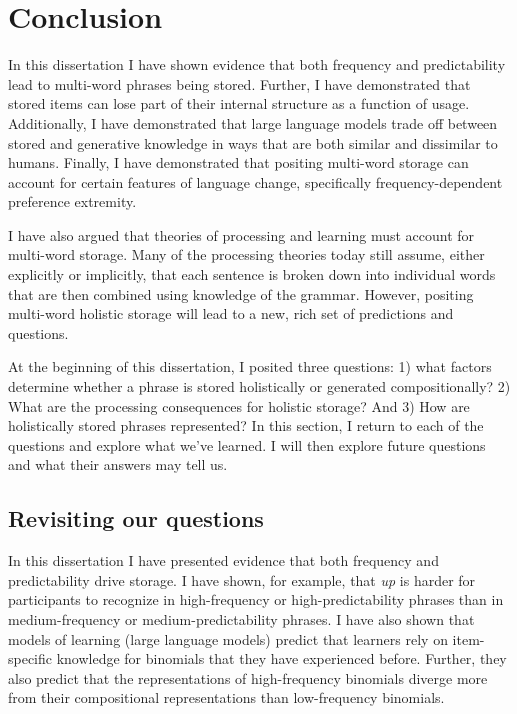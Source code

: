 \documentclass[
  12pt,
  letterpaper,
]{scrreport}
\begin{document}

\chapter{Conclusion}\label{conclusion-4}

In this dissertation I have shown evidence that both frequency and
predictability lead to multi-word phrases being stored. Further, I have
demonstrated that stored items can lose part of their internal structure
as a function of usage. Additionally, I have demonstrated that large
language models trade off between stored and generative knowledge in
ways that are both similar and dissimilar to humans. Finally, I have
demonstrated that positing multi-word storage can account for certain
features of language change, specifically frequency-dependent preference
extremity.

I have also argued that theories of processing and learning must account
for multi-word storage. Many of the processing theories today still
assume, either explicitly or implicitly, that each sentence is broken
down into individual words that are then combined using knowledge of the
grammar. However, positing multi-word holistic storage will lead to a
new, rich set of predictions and questions.

At the beginning of this dissertation, I posited three questions: 1)
what factors determine whether a phrase is stored holistically or
generated compositionally? 2) What are the processing consequences for
holistic storage? And 3) How are holistically stored phrases
represented? In this section, I return to each of the questions and
explore what we've learned. I will then explore future questions and
what their answers may tell us.

\section{Revisiting our questions}\label{revisiting-our-questions}

In this dissertation I have presented evidence that both frequency and
predictability drive storage. I have shown, for example, that \emph{up}
is harder for participants to recognize in high-frequency or
high-predictability phrases than in medium-frequency or
medium-predictability phrases. I have also shown that models of learning
(large language models) predict that learners rely on item-specific
knowledge for binomials that they have experienced before. Further, they
also predict that the representations of high-frequency binomials
diverge more from their compositional representations than low-frequency
binomials.
\end{document}

